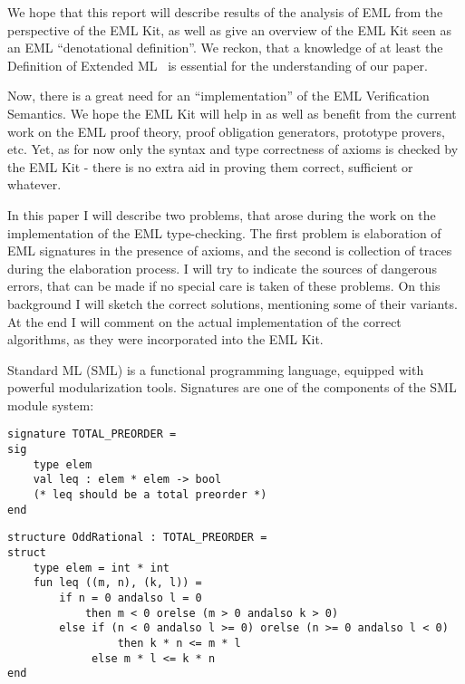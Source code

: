 {We hope that this report will describe results
of the analysis of EML from the perspective
of the EML Kit, as well as give an overview of the EML Kit seen 
as an EML ``denotational definition''. We reckon, that  
a knowledge of at least the Definition of Extended ML~\cite{bib:KST94} 
is essential for the understanding of our paper.

Now, there is a great need for an ``implementation'' 
of the EML Verification Semantics. We hope the EML Kit will help in
as well as benefit from the current work on the EML proof theory,
proof obligation generators, prototype provers, etc.
Yet, as for now only the syntax and type correctness of 
axioms is checked by the EML Kit - there is no extra aid
in proving them correct, sufficient or whatever. 



In this paper I will describe two problems,
that arose during the work on the implementation of the EML type-checking.
The first problem is elaboration of EML signatures in the presence of axioms,
and the second is collection of traces during the elaboration process.
I will try to indicate the sources of dangerous errors, 
that can be made if no special care is taken of these problems.
On this background I will sketch the correct solutions, mentioning some of their variants. 
At the end I will comment on the actual implementation of the correct algorithms, 
as they were incorporated into the EML Kit.


Standard ML (SML) \cite{MTH90} is a functional programming language,
equipped with powerful modularization tools.
Signatures are one of the components of the SML module system:
}
{}
\begin{verbatim}
signature TOTAL_PREORDER =
sig
    type elem 
    val leq : elem * elem -> bool 
    (* leq should be a total preorder *)
end
\end{verbatim}
\begin{verbatim}
structure OddRational : TOTAL_PREORDER =
struct
    type elem = int * int
    fun leq ((m, n), (k, l)) = 
        if n = 0 andalso l = 0 
            then m < 0 orelse (m > 0 andalso k > 0)
        else if (n < 0 andalso l >= 0) orelse (n >= 0 andalso l < 0)
                 then k * n <= m * l
             else m * l <= k * n 
end
\end{verbatim}

\subsection{\seceml}
\label{sec:eml}


